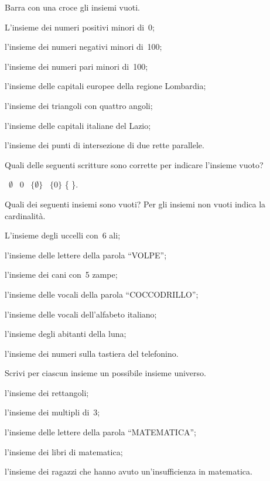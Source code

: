 \begin{esercizio}
\label{ese:5.11}
Barra con una croce gli insiemi vuoti.
\begin{enumeratea}
 \item L'insieme dei numeri positivi minori di~0;
 \item l'insieme dei numeri negativi minori di~100;
 \item l'insieme dei numeri pari minori di~100;
 \item l'insieme delle capitali europee della regione Lombardia;
 \item l'insieme dei triangoli con quattro angoli;
 \item l'insieme delle capitali italiane del Lazio;
 \item l'insieme dei punti di intersezione di due rette parallele.
 \end{enumeratea}
\end{esercizio}

\begin{esercizio}
\label{ese:5.12}
Quali delle seguenti scritture sono corrette per indicare
l'insieme vuoto?
\begin{center}
 \boxA\quad~$\emptyset $ \quad\boxB\quad~0 \quad\boxC\quad~$\{\emptyset \}$ \quad\boxD\quad~$\{0\}$ \quad\boxE\quad \{ \}.
\end{center}
\end{esercizio}
\pagebreak
\begin{esercizio}
\label{ese:5.13}
Quali dei seguenti insiemi sono vuoti? Per gli insiemi non vuoti indica la cardinalità.
\begin{enumeratea}
\item L'insieme degli uccelli con~6 ali;
\item l'insieme delle lettere della parola ``VOLPE'';
\item l'insieme dei cani con~5 zampe;
\item l'insieme delle vocali della parola ``COCCODRILLO'';
\item l'insieme delle vocali dell'alfabeto italiano;
\item l'insieme degli abitanti della luna;
\item l'insieme dei numeri sulla tastiera del telefonino.
\end{enumeratea}
\end{esercizio}

\begin{esercizio}
\label{ese:5.14}
Scrivi per ciascun insieme un possibile insieme universo.
\begin{enumeratea}
\item l'insieme dei rettangoli;
\item l'insieme dei multipli di~3;
\item l'insieme delle lettere della parola ``MATEMATICA'';
\item l'insieme dei libri di matematica;
\item l'insieme dei ragazzi che hanno avuto un'insufficienza in matematica.
\end{enumeratea}
\end{esercizio}

